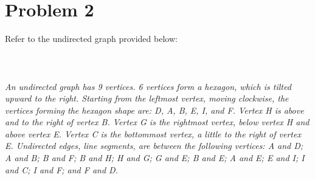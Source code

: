\documentclass{amsart}
\theoremstyle{definition}
\theoremstyle{Exercise}
\theoremstyle{remark}
\theoremstyle{rule}
\numberwithin{equation}{section}
\begin{document}
 \newpage

 

\section*{Problem 2}    
    
Refer to the undirected graph provided below:
\\\\
  \\\\
{\color{blue}{\bf Figure 6:} \emph{An undirected graph has 9 vertices. 6 vertices form a hexagon, which is tilted upward to the right. Starting from the leftmost vertex, moving clockwise, the vertices forming the hexagon shape are: D, A, B, E, I, and F. Vertex H is above and to the right of vertex B. Vertex G is the rightmost vertex, below vertex H and above vertex E. Vertex C is the bottommost vertex, a little to the right of vertex E. Undirected edges, line segments, are between the following vertices: A and D; A and B; B and F; B and H; H and G; G and E; B and E; A and E; E and I; I and C; I and F; and F and D.
}
}
\\
\\
\end{document}
